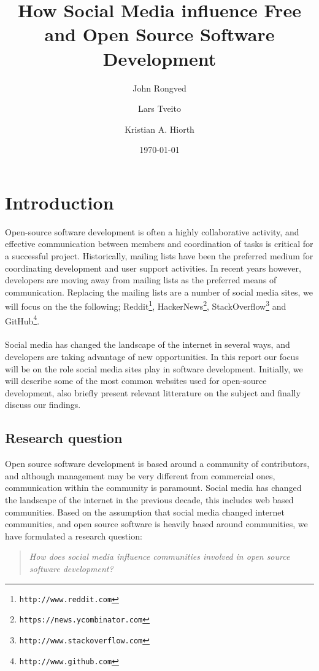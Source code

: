 \documentclass[a4paper,11pt]{article} %
\title{How Social Media influence Free and Open Source Software Development}
\date{\today}
\author{John Rongved \and Lars Tveito \and Kristian A. Hiorth}
\begin{document}
\ififorside{}

\tableofcontents{}
\newpage
\section{Introduction}

Open-source software development is often a highly collaborative activity, and effective communication 
between members and coordination of tasks is critical for a successful project. 
Historically, mailing lists have been the preferred medium for coordinating development
and user support activities\cite{Vasilescu14StackOverflow}. In recent years however, 
developers are moving away from mailing lists as the preferred means of communication.
Replacing the mailing lists are a number of social media sites, we will focus on the the following;
Reddit\footnote{\texttt{http://www.reddit.com}}, HackerNews\footnote{\texttt{https://news.ycombinator.com}},
StackOverflow\footnote{\texttt{http://www.stackoverflow.com}} and GitHub\footnote{\texttt{http://www.github.com}}.
\\\\Social media has changed the landscape of the internet in several ways, and developers are taking advantage of new opportunities. In this report our focus will be on the role social
media sites play in software development. Initially, we will describe some of the most common
websites used for open-source development, also briefly present relevant 
litterature on the subject and finally discuss our findings.

\subsection{Research question}

Open source software development is based around a community of contributors, and although
management may be very different from commercial ones, communication within the community is paramount.
Social media has changed the landscape of the internet in the previous decade\cite{Kaplan201059}, this includes web based communities. Based on the assumption that social media changed internet communities, and open source
software is heavily based around communities, we have formulated a research question:
\begin{quote}
\textit{How does social media influence communities involved in open source software development?}
\end{quote}
\end{document}
